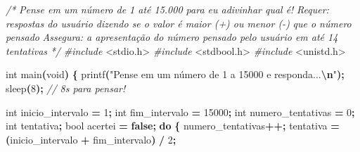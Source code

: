 \documentclass[
  11pt,
  a4paper,
]{scrbook}
\newenvironment{Shaded}{\begin{snugshade}}{\end{snugshade}}
\newcommand{\CommentTok}[1]{\textcolor[rgb]{0.56,0.35,0.01}{\textit{#1}}}
\newcommand{\ControlFlowTok}[1]{\textcolor[rgb]{0.13,0.29,0.53}{\textbf{#1}}}
\newcommand{\DataTypeTok}[1]{\textcolor[rgb]{0.13,0.29,0.53}{#1}}
\newcommand{\DecValTok}[1]{\textcolor[rgb]{0.00,0.00,0.81}{#1}}
\newcommand{\ImportTok}[1]{#1}
\newcommand{\KeywordTok}[1]{\textcolor[rgb]{0.13,0.29,0.53}{\textbf{#1}}}
\newcommand{\NormalTok}[1]{#1}
\newcommand{\OperatorTok}[1]{\textcolor[rgb]{0.81,0.36,0.00}{\textbf{#1}}}
\newcommand{\PreprocessorTok}[1]{\textcolor[rgb]{0.56,0.35,0.01}{\textit{#1}}}
\newcommand{\SpecialCharTok}[1]{\textcolor[rgb]{0.81,0.36,0.00}{\textbf{#1}}}
\newcommand{\StringTok}[1]{\textcolor[rgb]{0.31,0.60,0.02}{#1}}
\begin{document}
\begin{Shaded}
\begin{Highlighting}[]
\CommentTok{/*}
\CommentTok{Pense em um número de 1 até 15.000 para eu adivinhar qual é!}
\CommentTok{Requer: respostas do usuário dizendo se o valor é maior (+) ou menor ({-})}
\CommentTok{    que o número pensado}
\CommentTok{Assegura: a apresentação do número pensado pelo usuário em até 14 tentativas}
\CommentTok{*/}
\PreprocessorTok{\#include }\ImportTok{\textless{}stdio.h\textgreater{}}
\PreprocessorTok{\#include }\ImportTok{\textless{}stdbool.h\textgreater{}}
\PreprocessorTok{\#include }\ImportTok{\textless{}unistd.h\textgreater{}}

\DataTypeTok{int}\NormalTok{ main}\OperatorTok{(}\DataTypeTok{void}\OperatorTok{)} \OperatorTok{\{}
\NormalTok{    printf}\OperatorTok{(}\StringTok{"Pense em um número de 1 a 15000 e responda...}\SpecialCharTok{\textbackslash{}n}\StringTok{"}\OperatorTok{);}
\NormalTok{    sleep}\OperatorTok{(}\DecValTok{8}\OperatorTok{);}  \CommentTok{// 8s para pensar!}

    \DataTypeTok{int}\NormalTok{ inicio\_intervalo }\OperatorTok{=} \DecValTok{1}\OperatorTok{;}
    \DataTypeTok{int}\NormalTok{ fim\_intervalo }\OperatorTok{=} \DecValTok{15000}\OperatorTok{;}
    \DataTypeTok{int}\NormalTok{ numero\_tentativas }\OperatorTok{=} \DecValTok{0}\OperatorTok{;}
    \DataTypeTok{int}\NormalTok{ tentativa}\OperatorTok{;}
    \DataTypeTok{bool}\NormalTok{ acertei }\OperatorTok{=} \KeywordTok{false}\OperatorTok{;}
    \ControlFlowTok{do} \OperatorTok{\{}
\NormalTok{        numero\_tentativas}\OperatorTok{++;}
\NormalTok{        tentativa }\OperatorTok{=} \OperatorTok{(}\NormalTok{inicio\_intervalo }\OperatorTok{+}\NormalTok{ fim\_intervalo}\OperatorTok{)} \OperatorTok{/} \DecValTok{2}\OperatorTok{;}


\end{Highlighting}
\end{Shaded}
\end{document}
